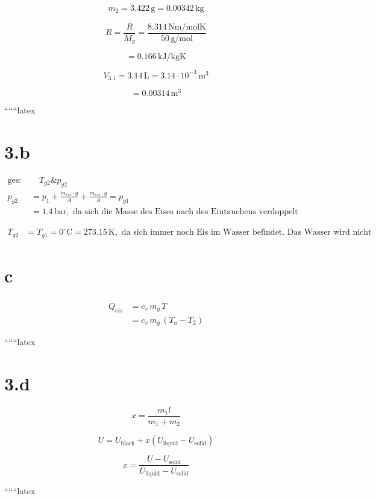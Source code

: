 \begin{equation*}
    m_2 = 3.422 \, \text{g} = 0.00342 \, \text{kg}
\end{equation*}

\begin{equation*}
    R = \frac{\bar{R}}{M_g} = \frac{8.314 \, \text{Nm/molK}}{50 \, \text{g/mol}}
\end{equation*}

\begin{equation*}
    = 0.166 \, \text{kJ/kgK}
\end{equation*}

\begin{equation*}
    V_{3.1} = 3.14 \, \text{L} = 3.14 \cdot 10^{-3} \, \text{m}^3
\end{equation*}

\begin{equation*}
    = 0.00314 \, \text{m}^3
\end{equation*}

``````latex


\section*{3.b}
\begin{align*}
    \text{ges: } & \quad T_{g2} \& p_{g2} \\
    p_{g2} &= p_1 + \frac{m_{eis} \cdot g}{A} + \frac{m_{eis} \cdot g}{A} = p_{g1} \\
    &= 1.4 \, \text{bar}, \text{ da sich die Masse des Eises nach des Eintauchens verdoppelt (Dichteunterschied Vernachlässigbar) bleibt der Druck gleich}
\end{align*}

\begin{align*}
    T_{g2} &= T_{g1} = 0^\circ \text{C} = 273.15 \, \text{K}, \text{ da sich immer noch Eis im Wasser befindet. Das Wasser wird nicht wärmer solange das Eis noch nicht geschmolzen ist.}
\end{align*}

\section*{c}
\begin{align*}
    \dot{Q}_{eis} &= c_v \, m_{g} \, \dot{T} \\
    &= c_v \, m_{g} \, (T_a - T_2)
\end{align*}

``````latex


\section*{3.d}

\[
x = \frac{m_1 l}{m_1 + m_2}
\]

\[
U = U_{\text{block}} + x \left( U_{\text{liquid}} - U_{\text{solid}} \right)
\]

\[
x = \frac{U - U_{\text{solid}}}{U_{\text{liquid}} - U_{\text{solid}}}
\]

``````latex


